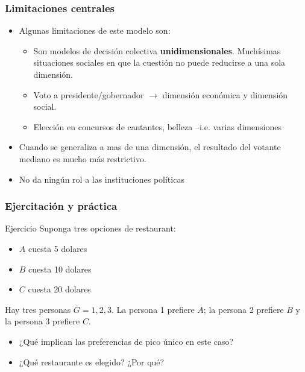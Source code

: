 \documentclass[14pt,aspectratio=169]{beamer}
\begin{document}
\begin{frame}\frametitle{Limitaciones centrales}
\begin{itemize}
\item Algunas limitaciones de este modelo son:
\begin{itemize}\itemsep 5pt \medskip
\item Son modelos de decisión colectiva
  \textbf{unidimensionales}. Muchísimas situaciones sociales en que la
  cuestión no puede reducirse a una sola dimensión.
\item Voto a presidente/gobernador $\longrightarrow$ dimensión
  económica y dimensión social.
\item Elección en concursos de cantantes, belleza --i.e. varias dimensiones
\end{itemize}
\item Cuando se generaliza a mas de una dimensión, el resultado del
  votante mediano es mucho más restrictivo.
\item No da ningún rol a las instituciones políticas 
\end{itemize}
\end{frame}


\begin{frame}\frametitle{Ejercitación y práctica}
\begin{block}{Ejercicio}
Suponga tres opciones de restaurant:
\begin{itemize}
\item $A$ cuesta 5 dolares
\item $B$ cuesta 10 dolares
\item $C$ cuesta 20 dolares
\end{itemize}
Hay tres personas $G={1,2,3}$. La persona 1 prefiere $A$; la persona 2
prefiere $B$ y la persona 3 prefiere $C$.
\begin{itemize}
\item ¿Qué implican las preferencias de pico único en este caso?
\item ¿Qué restaurante es elegido? ¿Por qué?
\end{itemize}
\end{block}
\end{frame}
\end{document}

